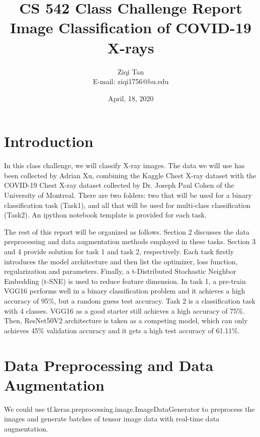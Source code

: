 \documentclass[a4paper,12pt]{article}
\begin{document}
   \title{CS 542 Class Challenge Report \\ Image Classification of COVID-19 X-rays}
   \author{Ziqi Tan \\ E-mail: ziqi1756@bu.edu}
          
   \date{April, 18, 2020}

   \maketitle
   
   \tableofcontents
 
  \newpage
    
\section{Introduction}
In this class challenge, we will classify X-ray images. 
The data we will use has been collected by Adrian Xu, 
combining the Kaggle Chest X-ray dataset with the COVID-19 Chest X-ray dataset collected 
by Dr. Joseph Paul Cohen of the University of Montreal. 
There are two folders: 
two that will be used for a binary classification task (Task1), 
and all that will be used for multi-class classification (Task2). 
An ipython notebook template is provided for each task. 

The rest of this report will be organized as follows. 
Section 2 discusses the data preprocessing and data augmentation methods employed in these tasks.
Section 3 and 4 provide solution for task 1 and task 2, respectively. 
Each task firstly introduces the model architecture and then list the optimizer, loss function, regularization and parameters.
Finally, a t-Distributed Stochastic Neighbor Embedding (t-SNE) is used to reduce feature dimension.
In task 1, a pre-train VGG16 performs well in a binary classification problem
and it achieves a high accuracy of 95\%, but a random guess test accuracy.
Task 2 is a classification task with 4 classes. VGG16 as a good starter still achieves a high accuracy of 75\%. 
Then, ResNet50V2 architecture is taken as a competing model, which can only achieves 45\% validation accuracy 
and it gets a high test accuracy of 61.11\%.


\section{Data Preprocessing and Data Augmentation}

We could use tf.keras.preprocessing.image.ImageDataGenerator 
to preprocess the images 
and generate batches of tensor image data with real-time data augmentation.
\end{document}
